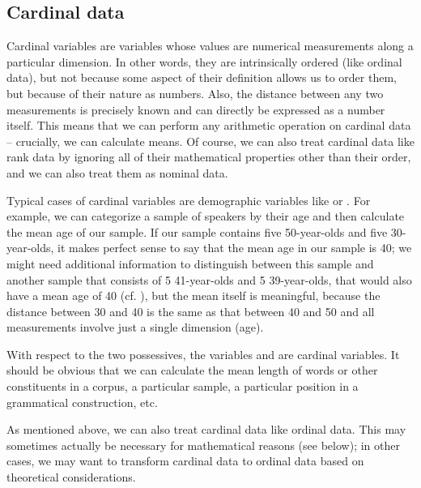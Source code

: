 \subsection{Cardinal data}
\label{sec:cardinaldata}

Cardinal  variables are variables whose values are numerical measurements  along a particular dimension. In other words, they are intrinsically ordered (like ordinal  data), but not because some aspect of their definition allows us to order them, but because of their nature as numbers. Also, the distance between any two measurements is precisely known and can directly be expressed as a number itself. This means that we can perform any arithmetic operation on cardinal  data -- crucially, we can calculate means. Of course, we can also treat cardinal data like rank data  by ignoring all of their mathematical properties other than their order, and we can also treat them as nominal  data.

Typical cases of cardinal  variables are demographic  variables like  or . For example, we can categorize  a sample of speakers by their age  and then calculate the mean  age  of our sample. If our sample contains five 50\hyp{}year\hyp{}olds and five 30\hyp{}year\hyp{}olds, it makes perfect sense to say that the mean age  in our sample is 40; we might need additional information to distinguish between this sample and another sample that consists of 5 41\hyp{}year\hyp{}olds and 5 39\hyp{}year\hyp{}olds, that would also have a mean age  of 40 (cf. ), but the mean  itself is meaningful, because the distance between 30 and 40 is the same as that between 40 and 50 and all measurements  involve just a single dimension  (age).

With respect to the two possessives,  the variables   and   are cardinal  variables. It should be obvious that we can calculate the mean  length of words or other constituents in a corpus, a particular sample, a particular position in a grammatical construction, etc.

As mentioned above, we can also treat cardinal  data like ordinal  data. This may sometimes actually be necessary for mathematical reasons (see  below); in other cases, we may want to transform cardinal data to ordinal data based on theoretical considerations.

